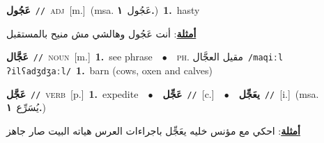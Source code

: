 \documentclass[10pt,a4paper,twoside]{article} %
\begin{document}
\begin{multicols}{2}
{\setlength\topsep{0pt}\textbf{\foreignlanguage{arabic}{عَجُول}}\ {\color{gray}\texttt{//}\color{black}}\ \textsc{adj}\ [m.]\ \color{gray}(msa. \foreignlanguage{arabic}{عَجُول}~\foreignlanguage{arabic}{\textbf{١.}})\color{black}\ \textbf{1.}~hasty\  \begin{flushright}\color{gray}\foreignlanguage{arabic}{\textbf{\underline{\foreignlanguage{arabic}{أمثلة}}}: أنت عَجُول وهالشي مش منيح بالمستقبل}\end{flushright}\color{black}} \vspace{2mm}

{\setlength\topsep{0pt}\textbf{\foreignlanguage{arabic}{عَجَّال}}\ {\color{gray}\texttt{//}\color{black}}\ \textsc{noun}\ [m.]\ \textbf{1.}~see phrase\ \ $\bullet$\ \ \textsc{ph.} \color{gray} \foreignlanguage{arabic}{مقيل العجَّال}\color{black}\ {\color{gray}\texttt{/{\sffamily maqiːl ʔilʕadʒdʒaːl}/}\color{black}}\ \textbf{1.}~barn (cows, oxen and calves)\ } \vspace{2mm}

{\setlength\topsep{0pt}\textbf{\foreignlanguage{arabic}{عَجَّل}}\ {\color{gray}\texttt{//}\color{black}}\ \textsc{verb}\ [p.]\ \textbf{1.}~expedite\ \ $\bullet$\ \ \setlength\topsep{0pt}\textbf{\foreignlanguage{arabic}{عَجِّل}}\ {\color{gray}\texttt{//}\color{black}}\ [c.]\ \ $\bullet$\ \ \setlength\topsep{0pt}\textbf{\foreignlanguage{arabic}{يعَجِّل}}\ {\color{gray}\texttt{//}\color{black}}\ [i.]\ \color{gray}(msa. \foreignlanguage{arabic}{يُسَرِّع}~\foreignlanguage{arabic}{\textbf{١.}})\color{black}\  \begin{flushright}\color{gray}\foreignlanguage{arabic}{\textbf{\underline{\foreignlanguage{arabic}{أمثلة}}}: احكي مع مؤنس خليه يعَجِّل باجراءات العرس هياته البيت صار جاهز}\end{flushright}\color{black}} \vspace{2mm}


\end{multicols}
\end{document}
